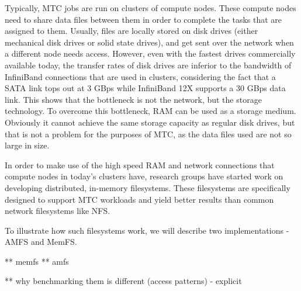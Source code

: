 Typically, MTC jobs are run on clusters of compute nodes. These compute nodes need to share data files between them in order to complete the tasks that are assigned to them. Usually, files are locally stored on disk drives (either mechanical disk drives or solid state drives), and get sent over the network when a different node needs access. However, even with the fastest drives commercially available today, the transfer rates of disk drives are inferior to the bandwidth of InfiniBand connections that are used in clusters, considering the fact that a SATA link tops out at 3 GBps while InfiniBand 12X supports a 30 GBps data link. This shows that the bottleneck is not the network, but the storage technology. To overcome this bottleneck, RAM can be used as a storage medium. Obviously it cannot achieve the same storage capacity as regular disk drives, but that is not a problem for the purposes of MTC, as the data files used are not so large in size.

In order to make use of the high speed RAM and network connections that compute nodes in today's clusters have, research groups have started work on developing distributed, in-memory filesystems. These filesystems are specifically designed to support MTC workloads and yield better results than common network filesystems like NFS.


To illustrate how such filesystems work, we will describe two implementations - AMFS\cite{amfs} and MemFS\cite{memfs}.

** memfs
** amfs


** why benchmarking them is different (access patterns) - explicit